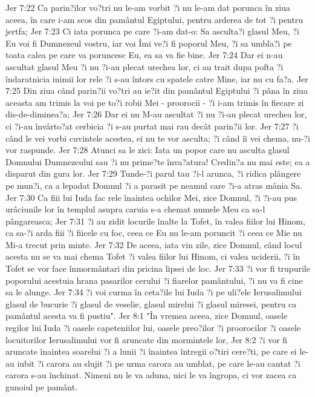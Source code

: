 Jer 7:22  Ca parin?ilor vo?tri nu le-am vorbit ?i nu le-am dat porunca în ziua aceea, în care i-am scos din pamântul Egiptului, pentru arderea de tot ?i pentru jertfa;
Jer 7:23  Ci iata porunca pe care ?i-am dat-o: Sa asculta?i glasul Meu, ?i Eu voi fi Dumnezeul vostru, iar voi Îmi ve?i fi poporul Meu, ?i sa umbla?i pe toata calea pe care va poruncesc Eu, ea sa va fie bine.
Jer 7:24  Dar ei n-au ascultat glasul Meu ?i nu ?i-au plecat urechea lor, ci au trait dupa pofta ?i îndaratnicia inimii lor rele ?i s-au întors cu spatele catre Mine, iar nu cu fa?a.
Jer 7:25  Din ziua când parin?ii vo?tri au ie?it din pamântul Egiptului ?i pâna în ziua aceasta am trimis la voi pe to?i robii Mei - proorocii - ?i i-am trimis în fiecare zi dis-de-diminea?a;
Jer 7:26  Dar ei nu M-au ascultat ?i nu ?i-au plecat urechea lor, ci ?i-au învârto?at cerbicia ?i s-au purtat mai rau decât parin?ii lor.
Jer 7:27  ?i când le vei vorbi cuvintele acestea, ei nu te vor asculta; ?i când îi vei chema, nu-?i vor raspunde.
Jer 7:28  Atunci sa le zici: Iata un popor care nu asculta glasul Domnului Dumnezeului sau ?i nu prime?te înva?atura! Credin?a nu mai este; ea a disparut din gura lor.
Jer 7:29  Tunde-?i parul tau ?i-l arunca, ?i ridica plângere pe mun?i, ca a lepadat Domnul ?i a parasit pe neamul care ?i-a atras mânia Sa.
Jer 7:30  Ca fiii lui Iuda fac rele înaintea ochilor Mei, zice Domnul, ?i ?i-au pus urâciunile lor în templul asupra caruia s-a chemat numele Meu ca sa-l pângareasca;
Jer 7:31  ?i au zidit locurile înalte la Tofet, în valea fiilor lui Hinom, ca sa-?i arda fiii ?i fiicele cu foc, ceea ce Eu nu le-am poruncit ?i ceea ce Mie nu Mi-a trecut prin minte.
Jer 7:32  De aceea, iata vin zile, zice Domnul, când locul acesta nu se va mai chema Tofet ?i valea fiilor lui Hinom, ci valea uciderii, ?i în Tofet se vor face înmormântari din pricina lipsei de loc.
Jer 7:33  ?i vor fi trupurile poporului acestuia hrana pasarilor cerului ?i fiarelor pamântului, ?i nu va fi cine sa le alunge.
Jer 7:34  ?i voi curma în ceta?ile lui Iuda ?i pe uli?ele Ierusalimului glasul de bucurie ?i glasul de veselie, glasul mirelui ?i glasul miresei, pentru ca pamântul acesta va fi pustiu".
Jer 8:1  "În vremea aceea, zice Domnul, oasele regilor lui Iuda ?i oasele capeteniilor lui, oasele preo?ilor ?i proorocilor ?i oasele locuitorilor Ierusalimului vor fi aruncate din mormintele lor,
Jer 8:2  ?i vor fi aruncate înaintea soarelui ?i a lunii ?i înaintea întregii o?tiri cere?ti, pe care ei le-au iubit ?i carora au slujit ?i pe urma carora au umblat, pe care le-au cautat ?i carora s-au închinat. Nimeni nu le va aduna, nici le va îngropa, ci vor zacea ca gunoiul pe pamânt.

